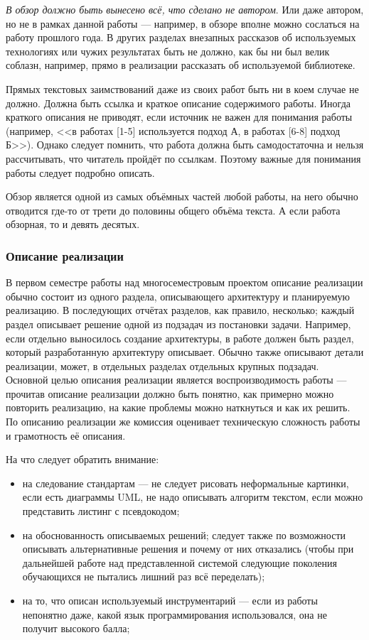 \documentclass{article}
\begin{document}
\emph{В обзор должно быть вынесено всё, что сделано не автором}. Или даже автором, но не в рамках данной работы --- например, в обзоре вполне можно сослаться на работу прошлого года. В других разделах внезапных рассказов об используемых технологиях или чужих результатах быть не должно, как бы ни был велик соблазн, например, прямо в реализации рассказать об используемой библиотеке. 

Прямых текстовых заимствований даже из своих работ быть ни в коем случае не должно. Должна быть ссылка и краткое описание содержимого работы. Иногда краткого описания не приводят, если источник не важен для понимания работы (например, <<в работах [1-5] используется подход А, в работах [6-8] подход Б>>). Однако следует помнить, что работа должна быть самодостаточна и нельзя рассчитывать, что читатель пройдёт по ссылкам. Поэтому важные для понимания работы следует подробно описать.

Обзор является одной из самых объёмных частей любой работы, на него обычно отводится где-то от трети до половины общего объёма текста. А если работа обзорная, то и девять десятых.

\subsubsection{Описание реализации}

В первом семестре работы над многосеместровым проектом описание реализации обычно состоит из одного раздела, описывающего архитектуру и планируемую реализацию. В последующих отчётах разделов, как правило, несколько; каждый раздел описывает решение одной из подзадач из постановки задачи. Например, если отдельно выносилось создание архитектуры, в работе должен быть раздел, который разработанную архитектуру описывает. Обычно также описывают детали реализации, может, в отдельных разделах отдельных крупных подзадач. Основной целью описания реализации является воспроизводимость работы --- прочитав описание реализации должно быть понятно, как примерно можно повторить реализацию, на какие проблемы можно наткнуться и как их решить. По описанию реализации же комиссия оценивает техническую сложность работы и грамотность её описания.

На что следует обратить внимание:

\begin{itemize}
    \item на следование стандартам --- не следует рисовать неформальные картинки, если есть диаграммы UML, не надо описывать алгоритм текстом, если можно представить листинг с псевдокодом;
    \item на обоснованность описываемых решений; следует также по возможности описывать альтернативные решения и почему от них отказались (чтобы при дальнейшей работе над представленной системой следующие поколения обучающихся не пытались лишний раз всё переделать);
    \item на то, что описан используемый инструментарий --- если из работы непонятно даже, какой язык программирования использовался, она не получит высокого балла;
\end{itemize}
\end{document}
